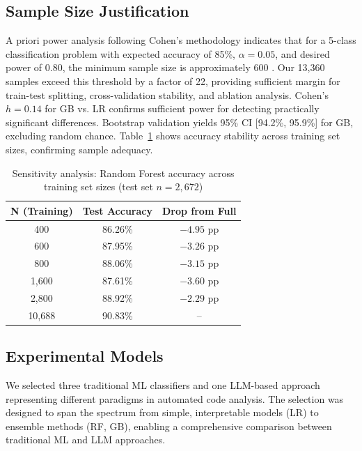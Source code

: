 \documentclass[10pt,a4paper]{article}
\begin{document}
\subsection{Sample Size Justification}

A priori power analysis following Cohen's methodology \cite{cohen1988statistical} indicates that for a 5-class classification problem with expected accuracy of 85\%, $\alpha = 0.05$, and desired power of 0.80, the minimum sample size is approximately 600 \cite{lachenbruch1998power}. Our 13,360 samples exceed this threshold by a factor of 22, providing sufficient margin for train-test splitting, cross-validation stability, and ablation analysis. Cohen's $h = 0.14$ for GB vs. LR confirms sufficient power for detecting practically significant differences. Bootstrap validation yields 95\% CI [94.2\%, 95.9\%] for GB, excluding random chance. Table~\ref{tab:sensitivity} shows accuracy stability across training set sizes, confirming sample adequacy.

\begin{table}[htbp]
\centering
\caption{Sensitivity analysis: Random Forest accuracy across training set sizes (test set $n=2{,}672$)}
\label{tab:sensitivity}
\begin{tabular}{@{}ccc@{}}
\toprule
N (Training) & Test Accuracy & Drop from Full \\
\midrule
400   & 86.26\% & $-4.95$ pp \\
600   & 87.95\% & $-3.26$ pp \\
800   & 88.06\% & $-3.15$ pp \\
1,600 & 87.61\% & $-3.60$ pp \\
2,800 & 88.92\% & $-2.29$ pp \\
10,688 & 90.83\% & -- \\
\bottomrule
\end{tabular}
\end{table}

\subsection{Experimental Models}

We selected three traditional ML classifiers and one LLM-based approach
representing different paradigms in automated code analysis. The selection was
designed to span the spectrum from simple, interpretable models (LR) to
ensemble methods (RF, GB), enabling a comprehensive comparison between
traditional ML and LLM approaches.
\end{document}
